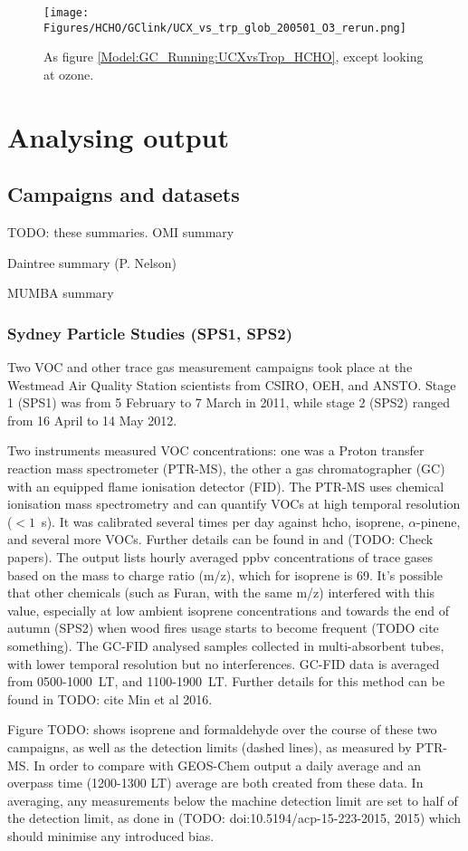     \begin{figure}%
      \texttt{[image: Figures/HCHO/GClink/UCX\_vs\_trp\_glob\_200501\_O3\_rerun.png]}
      \caption{%
        As figure \ref{Model:GC_Running:UCXvsTrop_HCHO}, except looking at ozone. 
      }
      \label{Model:GC_Running:UCXvsTrop_O3}
    \end{figure}

\section{Analysing output}

  \subsection{Campaigns and datasets}
  \label{BioIsop:Campaigns}
  TODO: these summaries.
  OMI summary
  
  Daintree summary (P. Nelson)
  
  MUMBA summary
  
    \subsubsection{Sydney Particle Studies (SPS1, SPS2)}
      Two VOC and other trace gas measurement campaigns took place at the Westmead Air Quality Station scientists from CSIRO, OEH, and ANSTO. 
      Stage 1 (SPS1) was from 5 February to 7 March in 2011, while stage 2 (SPS2) ranged from 16 April to 14 May 2012.
      
      Two instruments measured VOC concentrations: one was a Proton transfer reaction mass spectrometer (PTR-MS), the other a gas chromatographer (GC) with an equipped flame ionisation detector (FID).
      The PTR-MS uses chemical ionisation mass spectrometry and can quantify VOCs at high temporal resolution ($< 1$~s).
      It was calibrated several times per day against hcho, isoprene, $\alpha$-pinene, and several more VOCs. Further details can be found in \cite{bibid} and \cite{Dunne2012} (TODO: Check papers).
      The output lists hourly averaged ppbv concentrations of trace gases based on the mass to charge ratio (m/z), which for isoprene is 69.
      It's possible that other chemicals (such as Furan, with the same m/z) interfered with this value, especially at low ambient isoprene concentrations and towards the end of autumn (SPS2) when wood fires usage starts to become frequent (TODO cite something).
      The GC-FID analysed samples collected in multi-absorbent tubes, with lower temporal resolution but no interferences. GC-FID data is averaged from 0500-1000~LT, and 1100-1900~LT. Further details for this method can be found in TODO: cite Min et al 2016.
      
      Figure TODO: shows isoprene and formaldehyde over the course of these two campaigns, as well as the detection limits (dashed lines), as measured by PTR-MS. In order to compare with GEOS-Chem output a daily average and an overpass time (1200-1300 LT) average are both created from these data.
      In averaging, any measurements below the machine detection limit are set to half of the detection limit, as done in (TODO: doi:10.5194/acp-15-223-2015, 2015) which should minimise any introduced bias.
